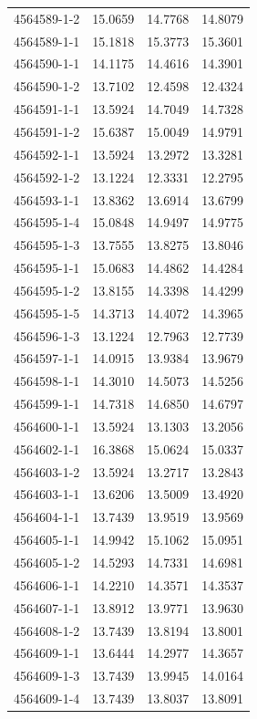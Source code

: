 \begin{longtable}{lrrr}
4564589-1-2 & 15.0659 & 14.7768 & 14.8079 \\
4564589-1-1 & 15.1818 & 15.3773 & 15.3601 \\
4564590-1-1 & 14.1175 & 14.4616 & 14.3901 \\
4564590-1-2 & 13.7102 & 12.4598 & 12.4324 \\
4564591-1-1 & 13.5924 & 14.7049 & 14.7328 \\
4564591-1-2 & 15.6387 & 15.0049 & 14.9791 \\
4564592-1-1 & 13.5924 & 13.2972 & 13.3281 \\
4564592-1-2 & 13.1224 & 12.3331 & 12.2795 \\
4564593-1-1 & 13.8362 & 13.6914 & 13.6799 \\
4564595-1-4 & 15.0848 & 14.9497 & 14.9775 \\
4564595-1-3 & 13.7555 & 13.8275 & 13.8046 \\
4564595-1-1 & 15.0683 & 14.4862 & 14.4284 \\
4564595-1-2 & 13.8155 & 14.3398 & 14.4299 \\
4564595-1-5 & 14.3713 & 14.4072 & 14.3965 \\
4564596-1-3 & 13.1224 & 12.7963 & 12.7739 \\
4564597-1-1 & 14.0915 & 13.9384 & 13.9679 \\
4564598-1-1 & 14.3010 & 14.5073 & 14.5256 \\
4564599-1-1 & 14.7318 & 14.6850 & 14.6797 \\
4564600-1-1 & 13.5924 & 13.1303 & 13.2056 \\
4564602-1-1 & 16.3868 & 15.0624 & 15.0337 \\
4564603-1-2 & 13.5924 & 13.2717 & 13.2843 \\
4564603-1-1 & 13.6206 & 13.5009 & 13.4920 \\
4564604-1-1 & 13.7439 & 13.9519 & 13.9569 \\
4564605-1-1 & 14.9942 & 15.1062 & 15.0951 \\
4564605-1-2 & 14.5293 & 14.7331 & 14.6981 \\
4564606-1-1 & 14.2210 & 14.3571 & 14.3537 \\
4564607-1-1 & 13.8912 & 13.9771 & 13.9630 \\
4564608-1-2 & 13.7439 & 13.8194 & 13.8001 \\
4564609-1-1 & 13.6444 & 14.2977 & 14.3657 \\
4564609-1-3 & 13.7439 & 13.9945 & 14.0164 \\
4564609-1-4 & 13.7439 & 13.8037 & 13.8091 \\

\end{longtable}
